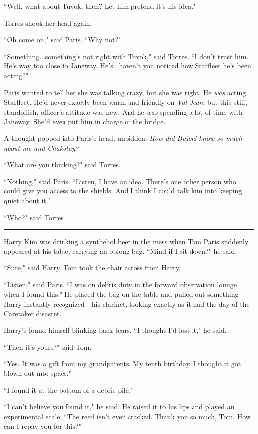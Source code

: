 \documentclass[twoside,letterpaper,12pt]{memoir}
\begin{document}
``Well, what about Tuvok, then? Let him pretend it's his idea." 

Torres shook her head again. 

``Oh come on," said Paris. ``Why not?" 

``Something...something's not right with Tuvok," said Torres. ``I don't trust him. He's way too close to Janeway. He's...haven't you noticed how Starfleet he's been acting?" 

Paris wanted to tell her she was talking crazy, but she was right. He \textit{was} acting Starfleet. He'd never exactly been warm and friendly on \textit{Val Jean}, but this stiff, standoffish, officer's attitude was new. And he \textit{was} spending a lot of time with Janeway. She'd even put him in charge of the bridge.

A thought popped into Paris's head, unbidden. \textit{How did Bujold know so much about me and Chakotay?} 

``What are you thinking?" said Torres. 

``Nothing," said Paris. ``Listen, I have an idea. There's one other person who could give you access to the shields. And I think I could talk him into keeping quiet about it." 

``Who?" said Torres. 

\begin{center}\rule{3cm}{0.4 pt}\end{center} 

Harry Kim was drinking a synthehol beer in the mess when Tom Paris suddenly appeared at his table, carrying an oblong bag. ``Mind if I sit down?" he said. 

``Sure," said Harry. Tom took the chair across from Harry. 

``Listen," said Paris. ``I was on debris duty in the forward observation lounge when I found this." He placed the bag on the table and pulled out something Harry instantly recognized---his clarinet, looking exactly as it had the day of the Caretaker disaster. 

Harry's found himself blinking back tears. ``I thought I'd lost it," he said. 

``Then it's yours?" said Tom. 

``Yes. It was a gift from my grandparents. My tenth birthday. I thought it got blown out into space." 

``I found it at the bottom of a debris pile." 

``I can't believe you found it," he said. He raised it to his lips and played an experimental scale. ``The reed isn't even cracked. Thank you so much, Tom. How can I repay you for this?" 
\end{document}
